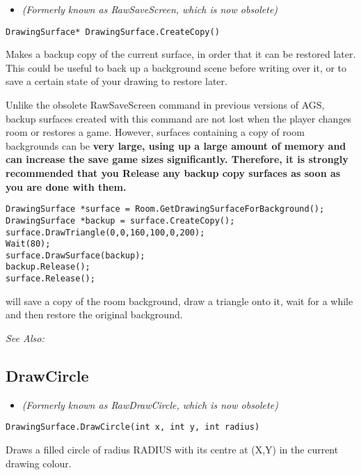 \begin{itemize}
\item \it{(Formerly known as RawSaveScreen, which is now obsolete)}
\end{itemize}

\begin{verbatim}
DrawingSurface* DrawingSurface.CreateCopy()
\end{verbatim}
Makes a backup copy of the current surface, in order that it can be
restored later. This could be useful to back up a background scene before
writing over it, or to save a certain state of your drawing to restore
later.

Unlike the obsolete RawSaveScreen command in previous versions of AGS, backup
surfaces created with this command are not lost when the player changes room or
restores a game. However, surfaces containing a copy of room backgrounds can
be \bf{very large}, using up a large amount of memory and can increase the
save game sizes significantly. Therefore, it is \bf{strongly recommended} that
you Release any backup copy surfaces as soon as you are done with them.

\begin{verbatim}
DrawingSurface *surface = Room.GetDrawingSurfaceForBackground();
DrawingSurface *backup = surface.CreateCopy();
surface.DrawTriangle(0,0,160,100,0,200);
Wait(80);
surface.DrawSurface(backup);
backup.Release();
surface.Release();
\end{verbatim}
will save a copy of the room background, draw a triangle onto it, wait for
a while and then restore the original background.

\it{See Also:} 


\subsection{DrawCircle}\label{DrawingSurface.DrawCircle}%

\begin{itemize}
\item \it{(Formerly known as RawDrawCircle, which is now obsolete)}
\end{itemize}

\begin{verbatim}
DrawingSurface.DrawCircle(int x, int y, int radius)
\end{verbatim}
Draws a filled circle of radius RADIUS with its centre at (X,Y) in the current drawing colour.

